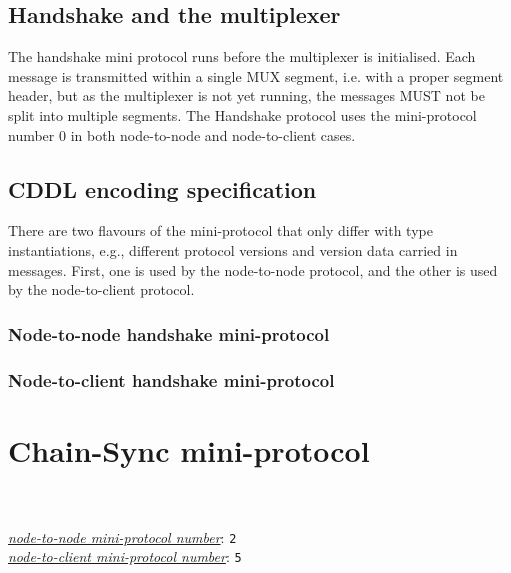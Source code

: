 \subsection{Handshake and the multiplexer}

The handshake mini protocol runs before the multiplexer is initialised.
Each message is transmitted within a single MUX segment, i.e. with a proper
segment header, but as the multiplexer is not yet running, the messages MUST not
be split into multiple segments.  The Handshake protocol uses the
mini-protocol number $0$ in both node-to-node and node-to-client cases.

\subsection{CDDL encoding specification}\label{handshake-cddl}
There are two flavours of the mini-protocol that only differ with type
instantiations, e.g., different protocol versions and version data carried in
messages.  First, one is used by the node-to-node protocol, and the other is used by the
node-to-client protocol.
\subsubsection{Node-to-node handshake mini-protocol}


\subsubsection{Node-to-client handshake mini-protocol}


\section{Chain-Sync mini-protocol}
\label{chain-sync-protocol}
\\
\\
\hyperref[table:node-to-node-protocol-numbers]{\textit{node-to-node mini-protocol number}}: \texttt{2}\\
\hyperref[table:node-to-client-protocol-numbers]{\textit{node-to-client mini-protocol number}}: \texttt{5}\\

